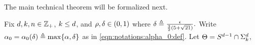 The main technical theorem will be formalized next.
\begin{theorem}
\label{thm:main-technical:sparse}
%
Fix
\(  \n, \k, \m \in \Z_{+}  \), \(  \k \leq \n  \), and \(  \rhoX, \deltaX \in (0,1)  \) where
\(
  \deltaX \defeq \frac{\epsilonX}{\frac{3}{2} ( 5+\sqrt{21} )}.
\)
Write
\(  \alphaO = \alphaO( \deltaX ) \defeq \alphaOExpr[\deltaX]  \)
as in \EQUATION \eqref{eqn:notations:alpha_0:def}.
Let
\(  \ParamSpace = \SparseSphereSubspace{\k}{\n}  \),

\end{theorem}
